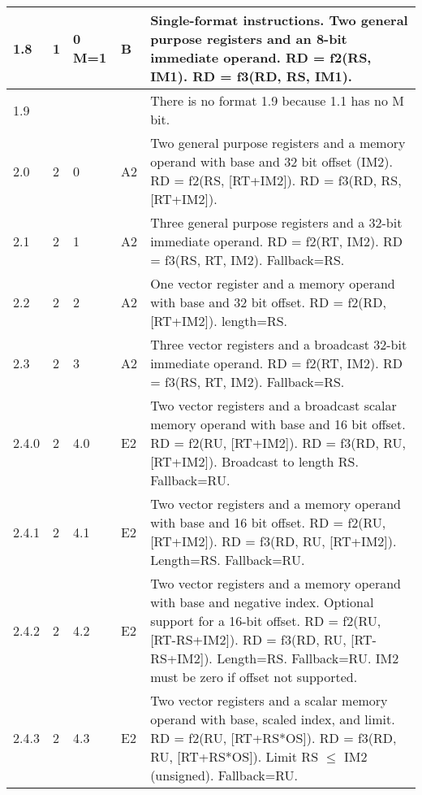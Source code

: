 \documentclass[forwardcom.tex]{subfiles}
\begin{document}
\begin{longtable} {|p{10mm}|p{6mm}|p{9mm}|p{7mm}|p{80mm}|}
\hline
1.8 & 1 & 0 M=1 & B & Single-format instructions. Two general purpose registers and an 8-bit immediate operand.\newline 
RD = f2(RS, IM1). RD = f3(RD, RS, IM1).\\

\hline
1.9 &  &  &  & There is no format 1.9 because 1.1 has no M bit.\\

\hline
2.0 & 2 & 0 & A2 & Two general purpose registers and a memory operand with base and 32 bit offset (IM2). \newline 
RD = f2(RS, [RT+IM2]). RD = f3(RD, RS, [RT+IM2]).\\

\hline
2.1 & 2 & 1 & A2 & Three general purpose registers and a 32-bit immediate operand.\newline 
RD = f2(RT, IM2). RD = f3(RS, RT, IM2). Fallback=RS.\\

\hline
2.2 & 2 & 2 & A2 & One vector register and a memory operand with base and 32 bit offset.\newline
RD = f2(RD, [RT+IM2]). length=RS.\\

\hline
2.3 & 2 & 3 & A2 & Three vector registers and a broadcast 32-bit immediate operand.\newline 
RD = f2(RT, IM2). RD = f3(RS, RT, IM2). Fallback=RS.\\

\hline
2.4.0 & 2 & 4.0 & E2 & Two vector registers and a broadcast scalar memory operand with base  and 16 bit offset.\newline 
RD = f2(RU, [RT+IM2]). RD = f3(RD, RU, [RT+IM2]). Broadcast to length RS. Fallback=RU.\\

\hline
2.4.1 & 2 & 4.1 & E2 & Two vector registers and a memory operand with base and 16 bit offset.\newline 
RD = f2(RU, [RT+IM2]). RD = f3(RD, RU, [RT+IM2]). Length=RS. Fallback=RU.\\

\hline
2.4.2 & 2 & 4.2 & E2 & Two vector registers and a memory operand with base and negative index. Optional support for a 16-bit offset.\newline 
RD = f2(RU, [RT-RS+IM2]). RD = f3(RD, RU, [RT-RS+IM2]). Length=RS. Fallback=RU. IM2 must be zero if offset not supported.\\

\hline
2.4.3 & 2 & 4.3 & E2 & Two vector registers and a scalar memory operand with base, scaled index, and limit.\newline 
RD = f2(RU, [RT+RS*OS]). RD = f3(RD, RU, [RT+RS*OS]). Limit RS $\leq$ IM2 (unsigned).  Fallback=RU.\\


\end{longtable}
\end{document}
